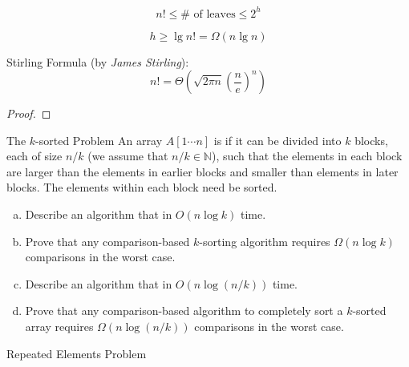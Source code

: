 \begin{frame}{}
  \begin{center}
    {\Large {}} 
  \end{center}

  \[
    \boxed{n! \le \# \text{ of leaves} \le 2^h}
  \]

  \pause
  \[
    h \ge \lg n! = \Omega(n \lg n)
  \]

  \pause
  \vspace{0.60cm}
  \begin{alertblock}{Stirling Formula (by {\it James Stirling}):}
    \[
      n! = \Theta(\sqrt{2 \pi n} \left(\frac{n}{e}\right)^{n})
    \]

    \begin{proof}
    \end{proof}
  \end{alertblock}
\end{frame}

\begin{frame}{}
  \begin{exampleblock}{The $k$-sorted Problem}
    An array $A[1 \cdots n]$ is  if it can be divided into $k$ blocks, 
    each of size $n/k$ (we assume that $n/k \in \mathbb{N}$), 
    such that the elements in each block are larger than the elements 
    in earlier blocks and smaller than elements in later blocks. 
    The elements within each block need  be sorted.
  
    \begin{enumerate}[(a)]
      \item Describe an algorithm that  in $O(n \log k)$ time.    
      \item Prove that any comparison-based $k$-sorting algorithm requires $\Omega(n \log k)$ comparisons in the worst case.    
      \item Describe an algorithm that  in $O(n \log(n/k))$ time.    
      \item Prove that any comparison-based algorithm to completely sort a $k$-sorted array requires $\Omega(n \log(n/k))$ comparisons in the worst case.
    \end{enumerate}
  \end{exampleblock}
\end{frame}

\begin{frame}{}
  Repeated Elements Problem
\end{frame}
